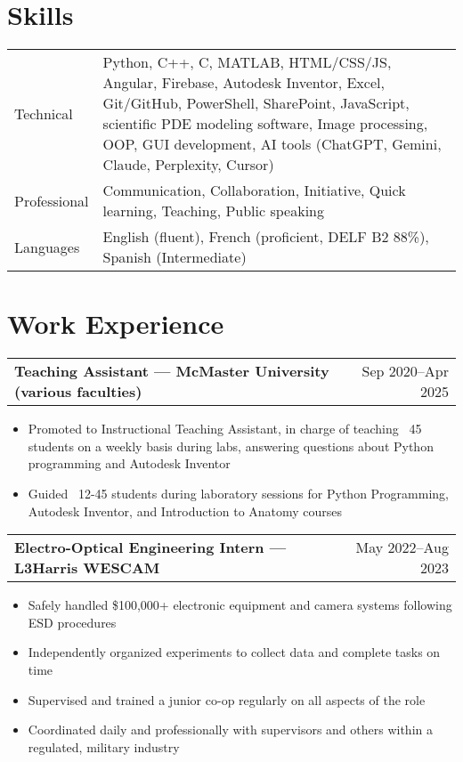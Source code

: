 \documentclass[a4paper,12pt]{article}
\makeatletter
\newenvironment{joblong}[2]
    {
    \begin{tabularx}{\linewidth}{@{}l X r@{}}
    \textbf{#1} & \hfill &  #2 \\[3.75pt]
    \end{tabularx}
    \begin{minipage}[t]{\linewidth}
    \begin{itemize}[nosep,after=\strut, leftmargin=1em, itemsep=3pt,label=--]
    }
    {
    \end{itemize}
    \end{minipage}    
    }
\makeatother
\begin{document}
\section{Skills}
\begin{tabularx}{\linewidth}{@{}l X@{}}
Technical &  \normalsize{Python, C++, C, MATLAB, HTML/CSS/JS, Angular, Firebase, Autodesk Inventor, Excel, Git/GitHub, PowerShell, SharePoint, JavaScript, scientific PDE modeling software, Image processing, OOP, GUI development, AI tools (ChatGPT, Gemini, Claude, Perplexity, Cursor)}\\
Professional  &  \normalsize{Communication, Collaboration, Initiative, Quick learning, Teaching, Public speaking}\\  
Languages & \normalsize{English (fluent), French (proficient, DELF B2 88\%), Spanish (Intermediate)}\\
\end{tabularx}

\section{Work Experience}

\begin{joblong}{Teaching Assistant — McMaster University (various faculties)}{Sep 2020--Apr 2025}
\item Promoted to Instructional Teaching Assistant, in charge of teaching ~45 students on a weekly basis during labs, answering questions about Python programming and Autodesk Inventor
\item Guided ~12-45 students during laboratory sessions for Python Programming, Autodesk Inventor, and Introduction to Anatomy courses
\end{joblong}

\begin{joblong}{Electro-Optical Engineering Intern — L3Harris WESCAM}{May 2022--Aug 2023}
\item Safely handled \$100,000+ electronic equipment and camera systems following ESD procedures 
\item Independently organized experiments to collect data and complete tasks on time
\item Supervised and trained a junior co-op regularly on all aspects of the role
\item Coordinated daily and professionally with supervisors and others within a regulated, military industry
\end{joblong}
\end{document}
